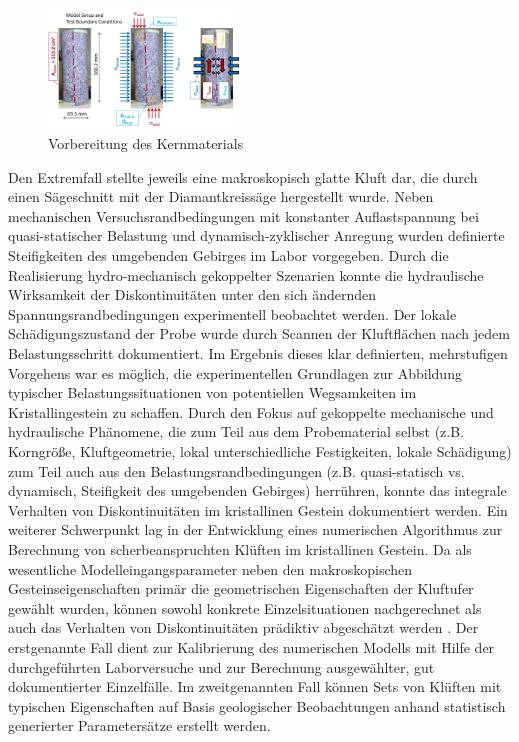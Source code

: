 \begin{figure}
\includegraphics[width=0.45\textwidth]{figures/geomint-wp3-11.png}
\caption{Vorbereitung des Kernmaterials}
\label{fig:wp3-results-tubaf}
\end{figure}
Den Extremfall stellte jeweils eine makroskopisch glatte Kluft dar, die durch einen Sägeschnitt mit der Diamantkreissäge hergestellt wurde. 
Neben mechanischen Versuchsrandbedingungen mit konstanter Auflastspannung bei quasi-statischer Belastung und dynamisch-zyklischer Anregung wurden definierte Steifigkeiten des umgebenden Gebirges im Labor vorgegeben. Durch die Realisierung hydro-mechanisch gekoppelter Szenarien konnte die hydraulische Wirksamkeit der Diskontinuitäten unter den sich ändernden Spannungsrandbedingungen experimentell beobachtet werden. Der lokale Schädigungszustand der Probe wurde durch Scannen der Kluftflächen nach jedem Belastungsschritt dokumentiert. Im Ergebnis dieses klar definierten, mehrstufigen Vorgehens war es möglich, die experimentellen Grundlagen zur Abbildung typischer Belastungssituationen von potentiellen Wegsamkeiten im Kristallingestein zu schaffen.
Durch den Fokus auf gekoppelte mechanische und hydraulische Phänomene, die zum Teil aus dem Probematerial selbst (z.B. Korngrö{\ss}e, Kluftgeometrie, lokal unterschiedliche Festigkeiten, lokale Schädigung) zum Teil auch aus den Belastungsrandbedingungen (z.B. quasi-statisch vs. dynamisch, Steifigkeit des umgebenden Gebirges) herrühren, konnte das integrale Verhalten von Diskontinuitäten im kristallinen Gestein dokumentiert werden. 
%
Ein weiterer Schwerpunkt lag in der Entwicklung eines numerischen Algorithmus zur Berechnung von scherbeanspruchten Klüften im kristallinen Gestein. Da als wesentliche Modelleingangsparameter neben den makroskopischen Gesteinseigenschaften primär die geometrischen Eigenschaften der Kluftufer gewählt wurden, können sowohl konkrete Einzelsituationen nachgerechnet als auch das Verhalten von Diskontinuitäten prädiktiv abgeschätzt werden \cite{Poetschke2020}.
Der erstgenannte Fall dient zur Kalibrierung des numerischen Modells mit Hilfe der durchgeführten Laborversuche und zur Berechnung ausgewählter, gut dokumentierter Einzelfälle. Im zweitgenannten Fall können Sets von Klüften mit typischen Eigenschaften auf Basis geologischer Beobachtungen anhand statistisch generierter Parametersätze erstellt werden. 

